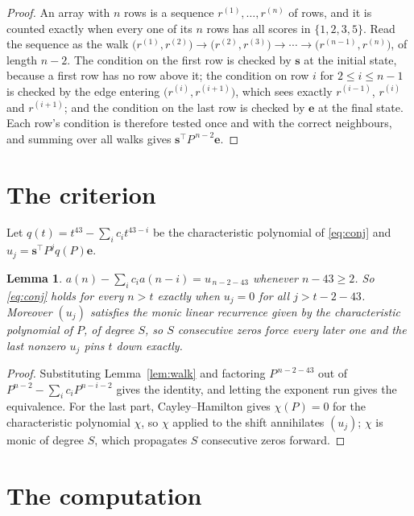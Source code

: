 \documentclass[11pt,a4paper]{article}
\theoremstyle{plain}
\newtheorem{lemma}[theorem]{Lemma}
\theoremstyle{definition}
\begin{document}
\begin{proof}
An array with $n$ rows is a sequence $r^{(1)},\dots,r^{(n)}$ of rows, and it is counted
exactly when every one of its $n$ rows has all scores in $\{1,2,3,5\}$. Read the sequence as the
walk $\bigl(r^{(1)},r^{(2)}\bigr)\to\bigl(r^{(2)},r^{(3)}\bigr)\to\cdots\to
\bigl(r^{(n-1)},r^{(n)}\bigr)$, of length $n-2$. The condition on the first row is
checked by $\mathbf{s}$ at the initial state, because a first row has no row above it; the
condition on row $i$ for $2\le i\le n-1$ is checked by the edge entering
$\bigl(r^{(i)},r^{(i+1)}\bigr)$, which sees exactly $r^{(i-1)}$, $r^{(i)}$ and
$r^{(i+1)}$; and the condition on the last row is checked by $\mathbf{e}$ at the final
state. Each row's condition is therefore tested once and with the correct neighbours, and
summing over all walks gives $\mathbf{s}^{\!\top}P^{\,n-2}\mathbf{e}$.
\end{proof}

\section{The criterion}

Let $q(t)=t^{43}-\sum_i c_i t^{43-i}$ be the characteristic polynomial of
\eqref{eq:conj} and $u_j=\mathbf{s}^{\!\top}P^{j}q(P)\mathbf{e}$.

\begin{lemma}\label{lem:crit}
$a(n)-\sum_i c_i a(n-i)=u_{\,n-2-43}$ whenever $n-43\ge2$. So \eqref{eq:conj}
holds for every $n>t$ exactly when $u_j=0$ for all $j>t-2-43$. Moreover $(u_j)$
satisfies the monic linear recurrence given by the characteristic polynomial of $P$, of
degree $S$, so $S$ consecutive zeros force every later one and the last nonzero $u_j$ pins
$t$ down exactly.
\end{lemma}

\begin{proof}
Substituting Lemma~\ref{lem:walk} and factoring $P^{\,n-2-43}$ out of
$P^{n-2}-\sum_i c_i P^{n-i-2}$ gives the identity, and letting the exponent run gives the
equivalence. For the last part, Cayley--Hamilton gives $\chi(P)=0$ for the characteristic
polynomial $\chi$, so $\chi$ applied to the shift annihilates $(u_j)$; $\chi$ is monic of
degree $S$, which propagates $S$ consecutive zeros forward.
\end{proof}

\section{The computation}
\end{document}
